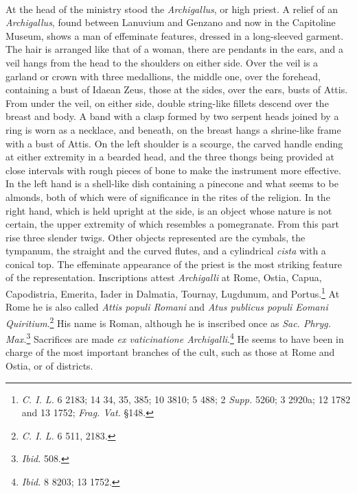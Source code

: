 \documentclass[a4paper, 11pt, oneside, polutonikogreek, english]{article}
\begin{document}
\paragraph{}
At the head of the ministry stood the \emph{Archigallus}, or high priest. A relief of an \emph{Archigallus}, found between Lanuvium and Genzano and now in the Capitoline Museum, shows a man of effeminate features, dressed in a long-sleeved garment. The hair is arranged like that of a woman, there are pendants in the ears, and a veil hangs from the head to the shoulders on either side. Over the veil is a garland or
crown with three medallions, the middle one, over the forehead, containing a bust of Idaean Zeus, those at the sides, over the ears, busts of Attis. From under the veil, on either side, double string-like fillets descend over the breast and body. A band with a clasp formed by two serpent heads joined by a ring is worn as a necklace, and beneath, on the breast hangs a shrine-like frame with a bust of Attis. On the left shoulder is a scourge, the carved handle ending at either extremity in a bearded head, and the three thongs being provided at close intervals with rough pieces of bone to make the instrument more effective. In the left hand is a shell-like dish containing a pinecone and what seems to be almonds, both of which were of significance in the rites of the religion. In the right hand, which is held upright at the side, is an object whose nature is not certain, the upper extremity of which resembles a pomegranate. From this part rise three slender twigs. Other objects represented are the cymbals, the tympanum, the straight and the curved flutes, and a cylindrical \emph{cista} with a conical top. The effeminate appearance of the priest is the most striking feature of the representation. Inscriptions attest \emph{Archigalli} at Rome, Ostia, Capua, Capodistria, Emerita, Iader in Dalmatia, Tournay, Lugdunum, and Portus.\footnote{\emph{C. I. L.} 6 2183; 14 34, 35, 385; 10 3810; 5 488; 2 \emph{Supp.} 5260; 3 2920a; 12 1782 and 13 1752; \emph{Frag. Vat.} §148.} At Rome he is also called \emph{Attis populi Romani} and \emph{Atus publicus populi Eomani Quiritium}.\footnote{\emph{C. I. L.} 6 511, 2183.} His name is Roman, although he is inscribed once as \emph{Sac. Phryg. Max.}\footnote{\emph{Ibid.} 508.} Sacrifices are made \emph{ex vaticinatione Archigalli}.\footnote{\emph{Ibid.} 8 8203; 13 1752.} He seems to have been in charge of the most important branches of the cult, such as those at Rome and Ostia, or of districts.
\end{document}
